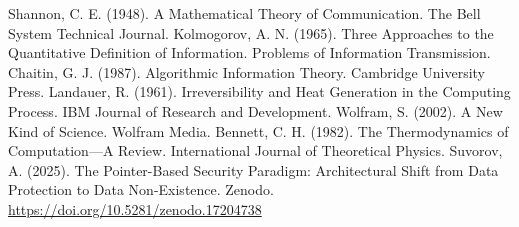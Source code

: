 \documentclass[11pt,a4paper]{article}
\begin{document}
\begin{thebibliography}{7}
 Shannon, C. E. (1948). A Mathematical Theory of Communication. The Bell System Technical Journal.
 Kolmogorov, A. N. (1965). Three Approaches to the Quantitative Definition of Information. Problems of Information Transmission.
 Chaitin, G. J. (1987). Algorithmic Information Theory. Cambridge University Press.
 Landauer, R. (1961). Irreversibility and Heat Generation in the Computing Process. IBM Journal of Research and Development.
 Wolfram, S. (2002). A New Kind of Science. Wolfram Media.
 Bennett, C. H. (1982). The Thermodynamics of Computation—A Review. International Journal of Theoretical Physics.
 Suvorov, A. (2025). The Pointer-Based Security Paradigm: Architectural Shift from Data Protection to Data Non-Existence. Zenodo. \url{https://doi.org/10.5281/zenodo.17204738}
\end{thebibliography}
\end{document}
